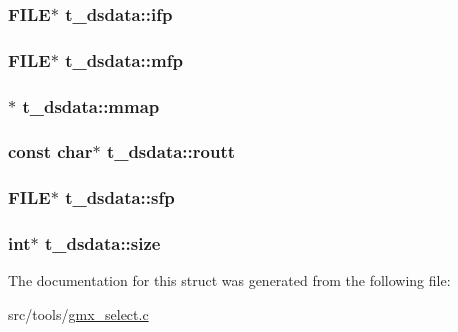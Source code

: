 \hypertarget{structt__dsdata_a461003af56657bda8b781330e58acd09}{
\subsubsection[{ifp}]{\setlength{\rightskip}{0pt plus 5cm}\-F\-I\-L\-E$\ast$ {\bf t\-\_\-dsdata\-::ifp}}}\label{structt__dsdata_a461003af56657bda8b781330e58acd09}
\hypertarget{structt__dsdata_a03ea565cc1c7a9c61f9eae13142f798a}{
\subsubsection[{mfp}]{\setlength{\rightskip}{0pt plus 5cm}\-F\-I\-L\-E$\ast$ {\bf t\-\_\-dsdata\-::mfp}}}\label{structt__dsdata_a03ea565cc1c7a9c61f9eae13142f798a}
\hypertarget{structt__dsdata_a9cfb422bf722fa2bcfbc8993dc9cf1c2}{
\subsubsection[{mmap}]{$\ast$ {\bf t\-\_\-dsdata\-::mmap}}}\label{structt__dsdata_a9cfb422bf722fa2bcfbc8993dc9cf1c2}
\hypertarget{structt__dsdata_a722adf8e1c69fa2770f1f00b6a61c688}{
\subsubsection[{routt}]{\setlength{\rightskip}{0pt plus 5cm}const char$\ast$ {\bf t\-\_\-dsdata\-::routt}}}\label{structt__dsdata_a722adf8e1c69fa2770f1f00b6a61c688}
\hypertarget{structt__dsdata_ae583f262d79fe69e4953ef5200c3d758}{
\subsubsection[{sfp}]{\setlength{\rightskip}{0pt plus 5cm}\-F\-I\-L\-E$\ast$ {\bf t\-\_\-dsdata\-::sfp}}}\label{structt__dsdata_ae583f262d79fe69e4953ef5200c3d758}
\hypertarget{structt__dsdata_aae4b299a9c50d30992c68111d4d9381d}{
\subsubsection[{size}]{\setlength{\rightskip}{0pt plus 5cm}int$\ast$ {\bf t\-\_\-dsdata\-::size}}}\label{structt__dsdata_aae4b299a9c50d30992c68111d4d9381d}


\-The documentation for this struct was generated from the following file\-:\begin{DoxyCompactItemize}
\item 
src/tools/\hyperlink{gmx__select_8c}{gmx\-\_\-select.\-c}\end{DoxyCompactItemize}
